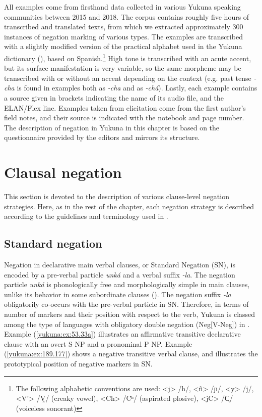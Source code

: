 \documentclass[output=paper,colorlinks,citecolor=brown]{langscibook}
\begin{document}
All examples come from firsthand data collected in various Yukuna speaking communities between 2015 and 2018. The corpus contains roughly five hours of transcribed and translated texts, from which we extracted approximately 300 instances of negation marking of various types.
The examples are transcribed with a slightly modified version of the practical alphabet used in the Yukuna dictionary (\citealt{SchauerEtAl2005}), based on Spanish.\footnote{The following alphabetic conventions are used: <j> /h/, <ñ> /ɲ/, <y> /j/, <V'> /V̰/ (creaky vowel), <Ch> /Cʰ/ (aspirated plosive), <jC> /C̥/ (voiceless sonorant)} High tone is transcribed with an acute accent, but its surface manifestation is very variable, so the same morpheme may be transcribed with or without an accent depending on the context (e.g. past tense \textit{-cha} is found in examples both as \textit{-cha} and as \textit{-chá}). Lastly, each example contains a source given in brackets indicating the name of its audio file, and the ELAN/Flex line. Examples taken from elicitation come from the first author's field notes, and their source is indicated with the notebook and page number. The description of negation in Yukuna in this chapter is based on the questionnaire provided by the editors  and mirrors its structure.

\section{Clausal negation} 

This section is devoted to the description of various clause-level negation strategies. Here, as in the rest of the chapter, each negation strategy is described according to the guidelines and terminology used in \citet{Miestamo2005,chapters/questionnaire,Miestamo2017}.

\subsection{Standard negation}\label{yukuna:SN}

Negation in declarative main verbal clauses, or Standard Negation (SN), is encoded by a pre-verbal particle \textit{unká} and a verbal suffix \textit{-la}. 
The negation particle \textit{unká} is phonologically free and morphologically simple in main clauses, unlike its behavior in some subordinate clauses (). The negation suffix \textit{-la} obligatorily co-occurs with the pre-verbal particle in SN. Therefore, in terms of number of markers and their position with respect to the verb, Yukuna is classed among the type of languages  with obligatory double negation (Neg[V-Neg]) in \citet{Dryer2013-wals143}. 
Example (\ref{yukuna:ex:53.33a}) illustrates an affirmative transitive declarative clause with an overt S NP and a pronominal P NP. Example (\ref{yukuna:ex:189.177}) shows a negative transitive verbal clause, and illustrates the prototypical position of negative markers in SN. 
\end{document}
